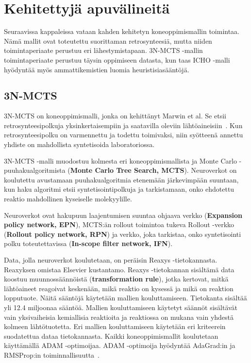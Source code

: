 \documentclass[finnish,twoside,censored,tkt,sw-line]{HYthesisML}
\begin{document}
\section{Kehitettyjä apuvälineitä}

Seuraavissa kappaleissa vataan kahden kehitetyn koneoppimismallin toimintaa.
Nämä mallit ovat toteutettu suorittaman retrosynteesiä, mutta niiden toimintaperiaate perustuu eri lähestymistapaan.
3N-MCTS -mallin toimintaperiaate perustuu täysin oppimiseen datasta, kun taas ICHO -malli hyödyntää myös ammattikemistien luomia heuristisiasääntöjä.

\subsection{3N-MCTS}

3N-MCTS on koneoppimismalli, jonka on kehittänyt Marwin et al.
Se etsii retrosynteesipolkuja yksinkertaisempiin ja saatavilla oleviin lähtöaineisiin~\cite{SeglerMarwinHS2018Pcsw}.
Kun retrosynteesipolku on varmennettu ja todettu toimivaksi, niin syötteenä annettu yhdiste on mahdollista syntetisoida laboratoriossa.

3N-MCTS -malli muodostuu kolmesta eri koneoppimismallista ja Monte Carlo -puuhakualgoritmista (\textbf{Monte Carlo Tree Search, MCTS}).
Neuroverkot on koulutettu avustamaan puuhakualgoritmia etenemään järkevimpään suuntaan, kun haku algoritmi etsii syntetisointipolkuja ja tarkistamaan, onko ehdotettu reaktio mahdollinen kyseiselle molekyylille.

Neuroverkot ovat hakupuun laajentumisen suuntaa ohjaava verkko (\textbf{Expansion policy network, EPN}), MCTS:än rollout toimintoa tukeva Rollout -verkko (\textbf{Rollout policy network, RPN}) ja verkko, joka tarkistaa, onko syntetisointi polku toteutettavissa (\textbf{In-scope filter network, IFN}).

Data, jolla neuroverkot koulutetaan, on peräisin Reaxys -tietokannasta.
Reaxyksen omistaa Elsevier kustantamo.
Reaxys -tietokannan sisältämä data koostuu muunnossäännöistä (\textbf{transformation rule}), jotka kertovat, mitkä lähtöaineet reagoivat keskenään, mikä reaktio on kysessä ja mikä on reaktion lopputuote.
Näitä sääntöjä käytetään mallien kouluttamiseen.
Tietokanta sisältää yli 12.4 miljoonaa sääntöä.
Mallien kouluttamiseen käytetyt säännöt sisältävät vain yksivaiheisia kemiallisia reaktioita ja reaktiossa on mukana vain yhdestä kolmeen lähtötuotetta.
Eri mallien kouluttamiseen käytetään eri kriteerein suodatettua dataa tietokannasta.
Kaikki koneoppimismallit koulutetaan käyttämällä ADAM -optimoijaa.
ADAM -optimoija hyödyntää AdaGrad:in ja RMSProp:in toiminnallisuutta~\cite{kingma2017adam}.
\end{document}
